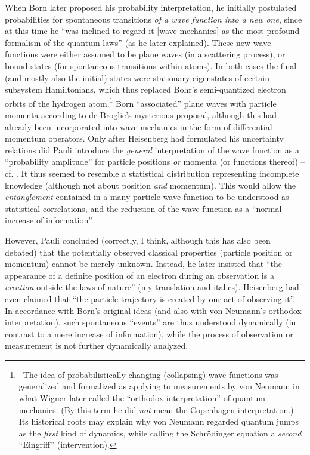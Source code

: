 When Born later proposed his probability
interpretation, he initially postulated probabilities for
spontaneous transitions {\it of a wave function into a new one}, since
at this time he ``was inclined to regard it [wave mechanics] as the
most profound formalism of the quantum laws'' (as he later explained).
These new wave functions were either assumed  to be plane waves (in a
scattering process), or bound states (for
spontaneous transitions within atoms). In both cases the
final (and mostly also the initial) states were stationary eigenstates
of certain subsystem Hamiltonians, which thus replaced Bohr's
semi-quantized electron orbits of the hydrogen atom.\footnote{\ The
idea of probabilistically changing (collapsing) wave functions was
generalized and formalized as applying to measurements by von Neumann
in what Wigner later called the ``orthodox interpretation'' of quantum
mechanics. (By this term he did {\it not} mean the Copenhagen
interpretation.) Its historical roots may explain why
von Neumann regarded quantum jumps as the {\it first} kind of
dynamics, while calling the Schr\"odinger equation a {\it
second} ``Eingriff'' (intervention).}   Born ``associated'' plane waves
with particle momenta according to de Broglie's mysterious proposal,
although this had already been incorporated into wave mechanics in the
form of differential momentum operators. Only after Heisenberg had
formulated his uncertainty relations did Pauli introduce the {\it
general} interpretation of the wave function as a ``probability
amplitude'' for particle positions {\it or} momenta (or functions
thereof) -- cf.\ts
\cite{Beller}. It thus seemed to resemble a statistical
distribution representing incomplete knowledge (although not about
position {\it and} momentum). This
would allow the {\it entanglement} contained in a many-particle
wave function to be understood as statistical correlations, and the
reduction of the wave function as a ``normal increase of
information''.

However, Pauli concluded (correctly, I think, although this has also
been debated) that the potentially observed classical properties
(particle position or momentum) cannot be merely unknown. Instead, he
later insisted
\cite{Pauli} that ``the appearance of a
definite position of an electron during an observation is a {\it
creation} outside the laws of nature'' (my translation and italics).
Heisenberg had even claimed that ``the particle trajectory is created
by our act of observing it''. In accordance with Born's original ideas
(and also with von Neumann's orthodox interpretation), such spontaneous
``events'' are thus understood dynamically (in contrast to a mere
increase of information), while the process of observation or
measurement is not further dynamically analyzed.

